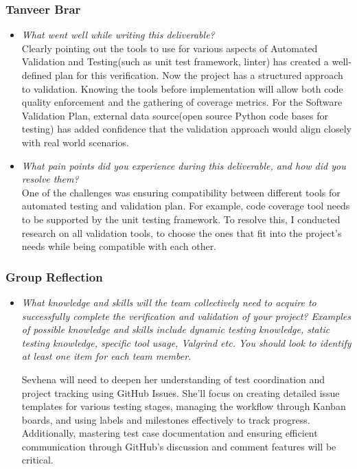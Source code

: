 \documentclass[12pt, titlepage]{article}
\begin{document}
\begin{appendices}
\subsubsection*{Tanveer Brar}
\begin{itemize}
    \item \textit{What went well while writing this deliverable?} \\

    Clearly pointing out the tools to use for various aspects of Automated Validation and Testing(such as unit test framework, linter) has created a well-defined plan for this verification. Now the project has a structured approach to validation. Knowing the tools before implementation will allow both code quality enforcement and the gathering of coverage metrics. For the Software Validation Plan, external data source(open source Python code bases for testing) has added confidence that the validation approach would align closely with real world scenarios.

    \item \textit{What pain points did you experience during this deliverable, and how did you resolve them?}\\

    One of the challenges was ensuring compatibility between different tools for automated testing and validation plan. For example, code coverage tool needs to be supported by the unit testing framework. To resolve this, I conducted research on all validation tools, to choose the ones that fit into the project's needs while being compatible with each other.

\end{itemize}

\subsubsection*{Group Reflection}
\begin{itemize}
  \item \textit{What knowledge and skills will the team collectively need to acquire to
  successfully complete the verification and validation of your project?
  Examples of possible knowledge and skills include dynamic testing knowledge,
  static testing knowledge, specific tool usage, Valgrind etc.  You should look to
  identify at least one item for each team member.\\} 
  
  Sevhena will need to deepen her understanding of test coordination and project 
  tracking using GitHub Issues. She’ll focus on creating detailed issue templates 
  for various testing stages, managing the workflow through Kanban boards, and using 
  labels and milestones effectively to track progress. Additionally, mastering test 
  case documentation and ensuring efficient communication through GitHub’s discussion 
  and comment features will be critical.


\end{itemize}
\end{appendices}
\end{document}
